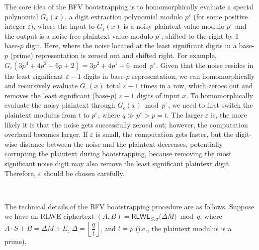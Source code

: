 The core idea of the BFV bootstrapping is to homomorphically evaluate a special polynomial $G_\varepsilon(x)$, a digit extraction polynomial modulo $p^\varepsilon$ (for some positive integer $\varepsilon$), where the input to $G_\varepsilon(x)$ is a noisy plaintext value modulo $p^\varepsilon$ and the output is a noise-free plaintext value modulo $p^\varepsilon$, shifted to the right by 1 base-$p$ digit. Here, where the noise located at the least significant digits in a base-$p$ (prime) representation is zeroed out and shifted right. For example, $G_\varepsilon(3p^3 + 4p^2 + 6p + 2) = 3p^2 + 4p^1 + 6 \bmod p^\varepsilon$. Given that the noise resides in the least significant $\varepsilon-1$ digits in base-$p$ representation, we can homomorphically and recursively evaluate $G_\varepsilon(x)$ total $\varepsilon-1$ times in a row, which zeroes out and removes the least significant (base-$p$) $\varepsilon-1$ digits of input $x$. To homomorphically evaluate the noisy plaintext through $G_\varepsilon(x) \bmod p^\varepsilon$, we need to first switch the plaintext modulus from $t$ to $p^\varepsilon$, where $q \gg p^{\varepsilon} > p = t$. The larger $\varepsilon$ is, the more likely it is that the noise gets successfully zeroed out; however, the computation overhead becomes larger. If $\varepsilon$ is small, the computation gets faster, but the digit-wise distance between the noise and the plaintext decreases, potentially corrupting the plaintext during bootstrapping, because removing the most significant noise digit may also remove the least significant plaintext digit. Therefore, $\varepsilon$ should be chosen carefully. 

$ $

The technical details of the BFV bootstrapping procedure are as follows. Suppose we have an RLWE ciphertext $(A, B)  = \textsf{RLWE}_{S, \sigma}\bm(\Delta M\bm) \bmod q$, where $A\cdot S + B = \Delta M + E$, \text{ } $\Delta = \left\lfloor\dfrac{q}{t}\right\rfloor$, and $t = p$ (i.e., the plaintext modulus is a prime).

